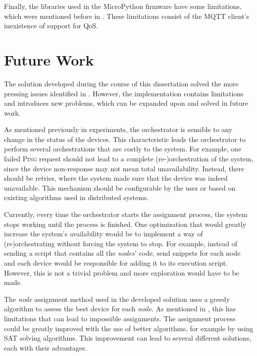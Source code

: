 Finally, the libraries used in the MicroPython firmware have some limitations, which were mentioned before in . These limitations consist of the MQTT client's inexistence of support for QoS.

\section{Future Work}\label{sec:future_work}

The solution developed during the course of this dissertation solved the more pressing issues identified in . However, the implementation contains limitations and introduces new problems, which can be expanded upon and solved in future work.

As mentioned previously in  experiments, the orchestrator is sensible to any change in the status of the devices. This characteristic leads the orchestrator to perform several orchestrations that are costly to the system. For example, one failed \textsc{Ping} request should not lead to a complete (re-)orchestration of the system, since the device non-response may not mean total unavailability. Instead, there should be retries, where the system made sure that the device was indeed unavailable. This mechanism should be configurable by the user or based on existing algorithms used in distributed systems.

Currently, every time the orchestrator starts the assignment process, the system stops working until the process is finished. One optimization that would greatly increase the system's availability would be to implement a way of (re)orchestrating without forcing the system to stop. For example, instead of sending a script that contains all the \textit{nodes}' code, send snippets for each node and each device would be responsible for adding it to its execution script. However, this is not a trivial problem and more exploration would have to be made.

The \textit{node} assignment method used in the developed solution uses a greedy algorithm to assess the best device for each \textit{node}. As mentioned in , this has limitations that can lead to impossible assignments. The assignment process could be greatly improved with the use of better algorithms, for example by using SAT solving algorithms. This improvement can lead to several different solutions, each with their advantages.

